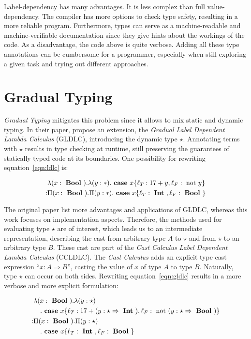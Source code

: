 Label-dependency has many advantages. It is less complex than full value-dependency. The compiler has more options to check type safety, resulting in a more reliable program. Furthermore, types can serve as a machine-readable and machine-verifiable documentation since they give hints about the workings of the code.
As a disadvantage, the code above is quite verbose. Adding all these type annotations can be cumbersome for a programmer, especially when still exploring a given task and trying out different approaches.

\section{Gradual Typing}

\emph{Gradual Typing} mitigates this problem since it allows to mix static and dynamic typing. In their paper, \cite{fu2021} propose an extension, the \emph{Gradual Label Dependent Lambda Calculus} (GLDLC), introducing the dynamic type $\star$. Annotating terms with $\star$ results in type checking at runtime, still preserving the guarantees of statically typed code at its boundaries. One possibility for rewriting equation~\ref{eqn:ldlc} is:

\begin{equation}\label{eqn:gldlc}
\begin{split}
&\lambda (x: \text{ \textbf{Bool} })
. \lambda (y: \ast)
. \text{ \textbf{case} } x \{\ell_T: 17+y,\ell_F: \text{ not } y\} \\
: & \Pi(x : \text{ \textbf{Bool} })
. \Pi (y: \ast)
. \text{ \textbf{case} } x \{\ell_T: \text{ \textbf{Int} }, \ell_F: \text{ \textbf{Bool} } \}
\end{split}
\end{equation}

The original paper list more advantages and applications of GLDLC, whereas this work focuses on implementation aspects. Therefore, the methods used for evaluating type $\star$ are of interest, which leads us to an intermediate representation, describing the cast from arbitrary type $A$ to $\star$ and from $\star$ to an arbitrary type $B$. These cast are part of the \emph{Cast Calculus Label Dependent Lambda Calculus} (CCLDLC). The \emph{Cast Calculus} adds an explicit type cast expression ``$x : A \Rightarrow B$'', casting the value of $x$ of type $A$ to type $B$. Naturally, type $\star$ can occur on both sides. Rewriting equation~\ref{eqn:gldlc} results in a more verbose and more explicit formulation:

\begin{equation}\label{eqn:ccldlc}
\begin{split}
&\lambda (x: \text{ \textbf{Bool} }) . \lambda (y: \star ) \\
&\quad . \text{ \textbf{case} } x \{\ell_T: 17+(y:\star \Rightarrow \text{ \textbf{Int} }),\ell_F: \text{ not } (y:\star \Rightarrow \text{ \textbf{Bool} })\} \\
: & \Pi(x : \text{ \textbf{Bool} }) . \Pi (y: \star ) \\
&\quad . \text{ \textbf{case} } x \{\ell_T: \text{ \textbf{Int} }, \ell_F: \text{ \textbf{Bool} } \}
\end{split}
\end{equation}

